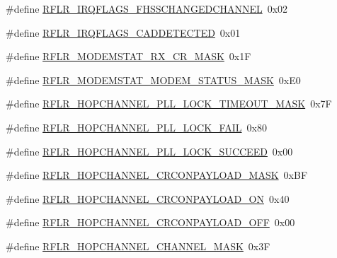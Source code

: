\begin{DoxyCompactItemize}
\item 
\#define \mbox{\hyperlink{sx1276_regs-_lo_ra_8h_a781c17401f3c0f94e56cd76d43ca0271}{R\+F\+L\+R\+\_\+\+I\+R\+Q\+F\+L\+A\+G\+S\+\_\+\+F\+H\+S\+S\+C\+H\+A\+N\+G\+E\+D\+C\+H\+A\+N\+N\+EL}}~0x02
\item 
\#define \mbox{\hyperlink{sx1276_regs-_lo_ra_8h_a301a9870f807e6c4f54ad608da0549ed}{R\+F\+L\+R\+\_\+\+I\+R\+Q\+F\+L\+A\+G\+S\+\_\+\+C\+A\+D\+D\+E\+T\+E\+C\+T\+ED}}~0x01
\item 
\#define \mbox{\hyperlink{sx1276_regs-_lo_ra_8h_af3688cb4f2ac1d6fe5669af690e813ed}{R\+F\+L\+R\+\_\+\+M\+O\+D\+E\+M\+S\+T\+A\+T\+\_\+\+R\+X\+\_\+\+C\+R\+\_\+\+M\+A\+SK}}~0x1F
\item 
\#define \mbox{\hyperlink{sx1276_regs-_lo_ra_8h_af57dfdb07c9b3873afb53a91443b0565}{R\+F\+L\+R\+\_\+\+M\+O\+D\+E\+M\+S\+T\+A\+T\+\_\+\+M\+O\+D\+E\+M\+\_\+\+S\+T\+A\+T\+U\+S\+\_\+\+M\+A\+SK}}~0x\+E0
\item 
\#define \mbox{\hyperlink{sx1276_regs-_lo_ra_8h_a9b65f0f8d357147986b31a6c668868fb}{R\+F\+L\+R\+\_\+\+H\+O\+P\+C\+H\+A\+N\+N\+E\+L\+\_\+\+P\+L\+L\+\_\+\+L\+O\+C\+K\+\_\+\+T\+I\+M\+E\+O\+U\+T\+\_\+\+M\+A\+SK}}~0x7F
\item 
\#define \mbox{\hyperlink{sx1276_regs-_lo_ra_8h_a5585b4aec7b248eb33ae15ba12b6d91a}{R\+F\+L\+R\+\_\+\+H\+O\+P\+C\+H\+A\+N\+N\+E\+L\+\_\+\+P\+L\+L\+\_\+\+L\+O\+C\+K\+\_\+\+F\+A\+IL}}~0x80
\item 
\#define \mbox{\hyperlink{sx1276_regs-_lo_ra_8h_aee5274333f27229f37276e92627fe9d0}{R\+F\+L\+R\+\_\+\+H\+O\+P\+C\+H\+A\+N\+N\+E\+L\+\_\+\+P\+L\+L\+\_\+\+L\+O\+C\+K\+\_\+\+S\+U\+C\+C\+E\+ED}}~0x00
\item 
\#define \mbox{\hyperlink{sx1276_regs-_lo_ra_8h_aa8fbfece67ad9c1feabed0dc5018d1fa}{R\+F\+L\+R\+\_\+\+H\+O\+P\+C\+H\+A\+N\+N\+E\+L\+\_\+\+C\+R\+C\+O\+N\+P\+A\+Y\+L\+O\+A\+D\+\_\+\+M\+A\+SK}}~0x\+BF
\item 
\#define \mbox{\hyperlink{sx1276_regs-_lo_ra_8h_ab93bd7b9eac440324cb3e24bd123af06}{R\+F\+L\+R\+\_\+\+H\+O\+P\+C\+H\+A\+N\+N\+E\+L\+\_\+\+C\+R\+C\+O\+N\+P\+A\+Y\+L\+O\+A\+D\+\_\+\+ON}}~0x40
\item 
\#define \mbox{\hyperlink{sx1276_regs-_lo_ra_8h_a1355316824e22da44242051ef2e802cd}{R\+F\+L\+R\+\_\+\+H\+O\+P\+C\+H\+A\+N\+N\+E\+L\+\_\+\+C\+R\+C\+O\+N\+P\+A\+Y\+L\+O\+A\+D\+\_\+\+O\+FF}}~0x00
\item 
\#define \mbox{\hyperlink{sx1276_regs-_lo_ra_8h_a8f0d9adf82ac36ad0e801b0ab96439a2}{R\+F\+L\+R\+\_\+\+H\+O\+P\+C\+H\+A\+N\+N\+E\+L\+\_\+\+C\+H\+A\+N\+N\+E\+L\+\_\+\+M\+A\+SK}}~0x3F
\item 

\end{DoxyCompactItemize}
